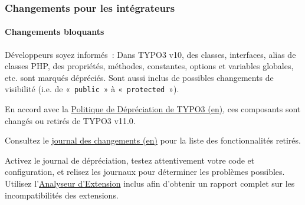 %

\begin{frame}[fragile]
	\frametitle{Changements pour les intégrateurs}
	\framesubtitle{Changements bloquants}

	\small
		Développeurs soyez informés~: Dans TYPO3 v10, des classes, interfaces, alias de classes PHP,
		des propriétés, méthodes, constantes, options et variables globales, etc. sont marqués
		dépréciés. Sont aussi inclus de possibles changements de visibilité (i.e. de
		«~\texttt{public}~» à «~\texttt{protected}~»).

		\vspace{0.2cm}

		En accord avec la
		\href{https://typo3.org/article/typo3-deprecation-policy}{Politique de Dépréciation de TYPO3 (en)},
		ces composants sont changés ou retirés de TYPO3 v11.0.

		\vspace{0.2cm}

		Consultez le \href{https://docs.typo3.org/c/typo3/cms-core/master/en-us/Changelog/master/Breaking-91473-DeprecatedFunctionalityRemoved.html}{journal des changements (en)}
		pour la liste des fonctionnalités retirés.

		\vspace{0.2cm}

		Activez le journal de dépréciation, testez attentivement votre code et configuration, et
		relisez les journaux pour déterminer les problèmes possibles. Utilisez
		l'\href{https://docs.typo3.org/m/typo3/reference-coreapi/master/en-us/ApiOverview/ExtensionScanner/Index.html}{Analyseur d'Extension}
		inclus afin d'obtenir un rapport complet sur les incompatibilités des extensions.

	\normalsize

\end{frame}

